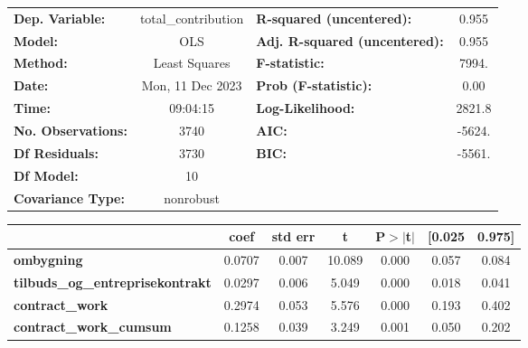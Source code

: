 \begin{center}
\begin{tabular}{lclc}
\toprule
\textbf{Dep. Variable:}                   & total\_contribution & \textbf{  R-squared (uncentered):}      &     0.955   \\
\textbf{Model:}                           &         OLS         & \textbf{  Adj. R-squared (uncentered):} &     0.955   \\
\textbf{Method:}                          &    Least Squares    & \textbf{  F-statistic:       }          &     7994.   \\
\textbf{Date:}                            &   Mon, 11 Dec 2023  & \textbf{  Prob (F-statistic):}          &     0.00    \\
\textbf{Time:}                            &       09:04:15      & \textbf{  Log-Likelihood:    }          &    2821.8   \\
\textbf{No. Observations:}                &          3740       & \textbf{  AIC:               }          &    -5624.   \\
\textbf{Df Residuals:}                    &          3730       & \textbf{  BIC:               }          &    -5561.   \\
\textbf{Df Model:}                        &            10       & \textbf{                     }          &             \\
\textbf{Covariance Type:}                 &      nonrobust      & \textbf{                     }          &             \\
\bottomrule
\end{tabular}
\begin{tabular}{lcccccc}
                                          & \textbf{coef} & \textbf{std err} & \textbf{t} & \textbf{P$> |$t$|$} & \textbf{[0.025} & \textbf{0.975]}  \\
\midrule
\textbf{ombygning}                        &       0.0707  &        0.007     &    10.089  &         0.000        &        0.057    &        0.084     \\
\textbf{tilbuds\_og\_entreprisekontrakt}  &       0.0297  &        0.006     &     5.049  &         0.000        &        0.018    &        0.041     \\
\textbf{contract\_work}                   &       0.2974  &        0.053     &     5.576  &         0.000        &        0.193    &        0.402     \\
\textbf{contract\_work\_cumsum}           &       0.1258  &        0.039     &     3.249  &         0.001        &        0.050    &        0.202     \\

\end{tabular}
\end{center}
